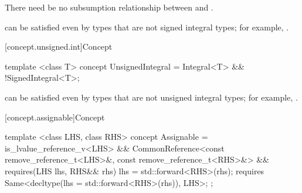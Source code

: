 \begin{itemdescr}
\pnum
There need be no subsumption relationship between
and
.

\pnum
\begin{note}
 can be satisfied even by types that are
not signed integral types; for example, .
\end{note}
\end{itemdescr}

[concept.unsigned.int]{Concept }

%
\begin{itemdecl}
template <class T>
concept UnsignedIntegral = Integral<T> && !SignedIntegral<T>;
\end{itemdecl}

\begin{itemdescr}
\pnum
\begin{note}
 can be satisfied even by types that are
not unsigned integral types; for example, .
\end{note}
\end{itemdescr}

[concept.assignable]{Concept }

%
\begin{itemdecl}
template <class LHS, class RHS>
concept Assignable =
  is_lvalue_reference_v<LHS> &&
  CommonReference<const remove_reference_t<LHS>&, const remove_reference_t<RHS>&> &&
  requires(LHS lhs, RHS&& rhs) {
    lhs = std::forward<RHS>(rhs);
    requires Same<decltype(lhs = std::forward<RHS>(rhs)), LHS>;
  };
\end{itemdecl}

